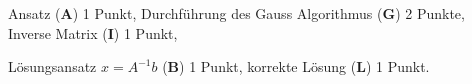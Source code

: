 \begin{bewertung}
\begin{teilaufgaben}
\item
Ansatz (\textbf{A}) 1 Punkt,
Durchführung des Gauss Algorithmus (\textbf{G}) 2 Punkte,
Inverse Matrix (\textbf{I}) 1 Punkt,
\item
Lösungsansatz $x=A^{-1}b$ (\textbf{B}) 1 Punkt,
korrekte Lösung (\textbf{L}) 1 Punkt.
\end{teilaufgaben}
\end{bewertung}

